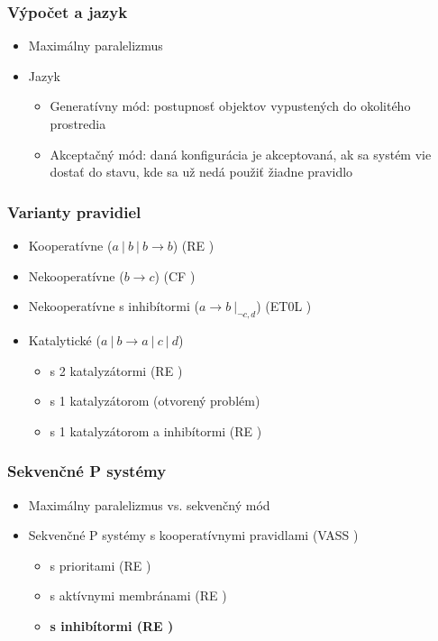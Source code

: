 \begin{frame}[t]\frametitle{Výpočet a jazyk}
  \begin{itemize}
    \item Maximálny paralelizmus
    \pause
    \item Jazyk
    \begin{itemize}
      \item Generatívny mód: postupnosť objektov vypustených do okolitého prostredia
      \pause
      \item Akceptačný mód: daná konfigurácia je akceptovaná, ak sa systém vie dostať do stavu, kde sa už nedá použiť žiadne pravidlo
    \end{itemize}
  \end{itemize}
\end{frame}

\begin{frame}[t]\frametitle{Varianty pravidiel}
  \begin{itemize}
    \item Kooperatívne ($a\ |\ b\ |\ b \rightarrow b$) (RE \cite{Paun98})
    \pause
    \item Nekooperatívne ($b \rightarrow c$) (CF \cite{Sburlan05dragos})
    \pause
    \item Nekooperatívne s inhibítormi ($a \rightarrow b\ |_{\neg{c,d}}$) (ET0L \cite{Ionescu:jucs_10_5:on_p_systems_with})
    \pause
    \item Katalytické ($a\ |\ b \rightarrow a\ |\ c\ |\ d$)
    \begin{itemize}
      \item s 2 katalyzátormi (RE \cite{Freund2005TwoCatalysts})
      \item s 1 katalyzátorom (otvorený problém)
      \item s 1 katalyzátorom a inhibítormi (RE \cite{Ionescu:jucs_10_5:on_p_systems_with})
    \end{itemize}
  \end{itemize}
\end{frame}
\note{}
\newpage
\note{}

\begin{frame}[t]\frametitle{Sekvenčné P systémy}
  \begin{itemize}
    \item Maximálny paralelizmus vs. sekvenčný mód
    \pause
    \item Sekvenčné P systémy s kooperatívnymi pravidlami (VASS \cite{Dang:2005:Sequential})
    \pause
    \begin{itemize}
      \item s prioritami (RE \cite{Dang:2005:Sequential})
      \pause
      \item s aktívnymi membránami (RE \cite{Dang:2005:Sequential})
      \pause
      \item {\bf s inhibítormi (RE \cite{Kovac14})}
    \end{itemize}
    \pause
    
  \end{itemize}
\end{frame}
\note{}

